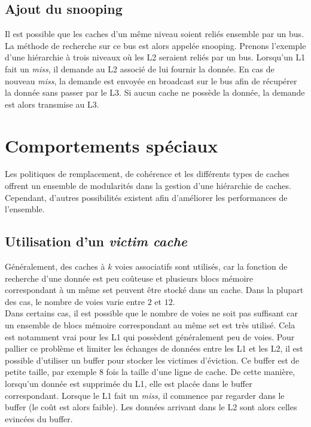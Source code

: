 \subsection{Ajout du snooping}
\label{snooping}
 Il est possible que les caches d'un même niveau soient reliés ensemble par un bus. La méthode de recherche sur ce bus est alors appelée snooping. Prenons l'exemple d'une hiérarchie à trois niveaux où les L2 seraient reliés par un bus. Lorsqu'un L1 fait un \textit{miss}, il demande au L2 associé de lui fournir la donnée. En cas de nouveau \textit{miss}, la demande est envoyée en broadcast sur le bus afin de récupérer la donnée sans passer par le L3. Si aucun cache ne possède la donnée, la demande est alors transmise au L3.

\newpage
\section{Comportements spéciaux}
Les politiques de remplacement, de cohérence et les différents types de caches offrent un ensemble de modularités dans la gestion d'une hiérarchie de caches. Cependant, d'autres possibilités existent afin d'améliorer les performances de l'ensemble.

\subsection{Utilisation d'un \textit{victim cache}}
Généralement, des caches à $k$ voies associatifs sont utilisés, car la fonction de recherche d'une donnée est peu coûteuse et plusieurs blocs mémoire correspondant à un même set peuvent être stocké dans un cache. Dans la plupart des cas, le nombre de voies varie entre $2$ et $12$. \\

Dans certains cas, il est possible que le nombre de voies ne soit pas suffisant car un ensemble de blocs mémoire correspondant au même set est très utilisé. Cela est notamment vrai pour les L1 qui possèdent généralement peu de voies. Pour pallier ce problème et limiter les échanges de données entre les L1 et les L2, il est possible d'utiliser un buffer pour stocker les victimes d'éviction. Ce buffer est de petite taille, par exemple $8$ fois la taille d'une ligne de cache. De cette manière, lorsqu'un donnée est supprimée du L1, elle est placée dans le buffer correspondant. Lorsque le L1 fait un \textit{miss}, il commence par regarder dans le buffer (le coût est alors faible). Les données arrivant dans le L2 sont alors celles evincées du buffer.

